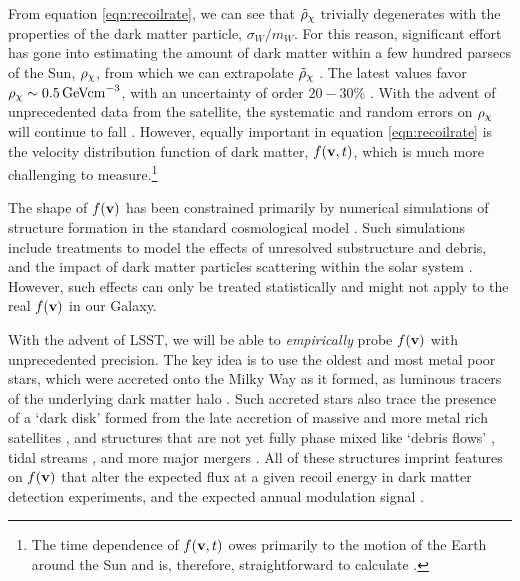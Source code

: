 From equation \ref{eqn:recoilrate}, we can see that $\tilde{\rho}_\mathrm{\chi}$ trivially degenerates with the properties of the dark matter particle, $\sigma_W/m_W$. For this reason, significant effort has gone into estimating the amount of dark matter within a few hundred parsecs of the Sun, $\rho_\mathrm{\chi}$, from which we can extrapolate $\tilde{\rho}_\mathrm{\chi}$ \citep[see][for a review]{2014JPhG...41f3101R}. The latest values favor $\rho_\mathrm{\chi} \sim 0.5\,{\rm GeV cm}^{-3}$, with an uncertainty of order $20-30$\% \citep[\eg,][]{2014A&A...571A..92B,2018MNRAS.478.1677S}. With the advent of unprecedented data from the \Gaia satellite, the systematic and random errors on $\rho_\mathrm{\chi}$ will continue to fall \citep{2014JPhG...41f3101R}. However, equally important in equation \ref{eqn:recoilrate} is the velocity distribution function of dark matter, $f({\bf v},t)$, which is much more challenging to measure.\footnote{The time dependence of $f({\bf v},t)$ owes primarily to the motion of the Earth around the Sun and is, therefore, straightforward to calculate \citep[\eg,][]{1986PhRvD..33.3495D}.}

The shape of $f({\bf v})$ has been constrained primarily by numerical simulations of structure formation in the standard cosmological model \citep[\eg,][]{2009MNRAS.395..797V,1210.2721}. Such simulations include treatments to model the effects of unresolved substructure and debris, and the impact of dark matter particles scattering within the solar system \citep[\eg,][]{2009PhRvD..79j3531P}. However, such effects can only be treated statistically and might not apply to the real $f({\bf v})$ in our Galaxy.

With the advent of LSST, we will be able to {\it empirically} probe $f({\bf v})$ with unprecedented precision. The key idea is to use the oldest and most metal poor stars, which were accreted onto the Milky Way as it formed, as luminous tracers of the underlying dark matter halo \citep{Lisanti:2011as,Kuhlen:2012fz,2014MNRAS.445L..21T,Lisanti:2014dva,2018PhRvL.120d1102H}. Such accreted stars also trace the presence of a `dark disk' formed from the late accretion of massive and more metal rich satellites \citep{1989AJ.....98.1554L,2008MNRAS.389.1041R,2009MNRAS.397...44R,2014MNRAS.444..515R,2015MNRAS.450.2874R}, and structures that are not yet fully phase mixed like `debris flows' \citep[\eg,][]{Lisanti:2011as}, tidal streams \citep[\eg,][]{2005PhRvD..71d3516F}, and more major mergers \citep{2018MNRAS.477.1472B,2018Natur.563...85H,necib2018}. All of these structures imprint features on $f({\bf v})$ that alter the expected flux at a given recoil energy in dark matter detection experiments, and the expected annual modulation signal \citep[\eg,][]{2005PhRvD..71d3516F,2009ApJ...696..920B,2018arXiv181011468E}.

